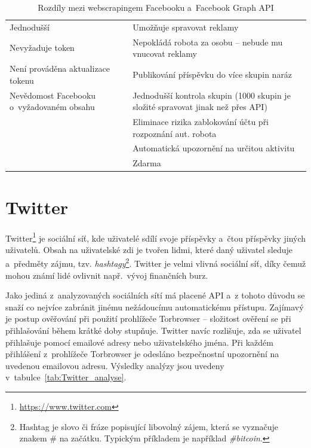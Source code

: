 \begin{table}[H]
\begin{tabularx}{\linewidth}{
    |>{\hsize=1\hsize}X|%
    >{\hsize=1\hsize}X|%
  }
\hline

\multicolumn{1}{|c|}{\textbf{sec:webscraping}} & \multicolumn{1}{|c|}{\textbf{Facebook Graph API}} \\ \hline
Jednodušší & Umožňuje spravovat reklamy \\ \hline
Nevyžaduje token & Nepokládá robota za osobu -- nebude mu vnucovat reklamy \\ \hline
Není prováděna aktualizace tokenu & Publikování příspěvku do více skupin naráz \\ \hline
Nevědomost Facebooku o~vyžadovaném obsahu &  Jednodušší kontrola skupin (1000 skupin je složité spravovat jinak než přes API)\\ \hline
& Eliminace rizika zablokování účtu při rozpoznání aut. robota \\ \hline
& Automatická upozornění na určitou aktivitu \\ \hline
& Zdarma \\ \hline
\end{tabularx}

\caption{Rozdíly mezi webscrapingem Facebooku a~Facebook Graph API}
\label{tab:FB_API_vs_webscraping}
\end{table}

\section{Twitter}
Twitter\footnote{\href{https://www.twitter.com}{https://www.twitter.com}} je sociální síť, kde uživatelé sdílí svoje příspěvky a~čtou příspěvky jiných uživatelů. Obsah na uživatelské zdi je tvořen lidmi, které daný uživatel sleduje a~předměty zájmu, tzv. \emph{hashtagy}\footnote{Hashtag je slovo či fráze popisující libovolný zájem, která se vyznačuje znakem \# na začátku. Typickým příkladem je například \emph{\#bitcoin}.}. Twitter je velmi vlivná sociální síť, díky čemuž mohou známí lidé ovlivnit např.~vývoj finančních burz.

Jako jediná z~analyzovaných sociálních sítí má placené API a~z tohoto důvodu se snaží co nejvíce zabránit jinému nežádoucímu automatickému přístupu. Zajímavý je postup ověřování při použití prohlížeče Torbrowser -- složitost ověření se při přihlašování během krátké doby stupňuje. Twitter navíc rozlišuje, zda se uživatel přihlašuje pomocí emailové adresy nebo uživatelského jména. Při každém přihlášení z~prohlížeče Torbrowser je odesláno bezpečnostní upozornění na uvedenou emailovou adresu. Výsledky analýzy jsou uvedeny v~tabulce~\ref{tab:Twitter_analyse}.

